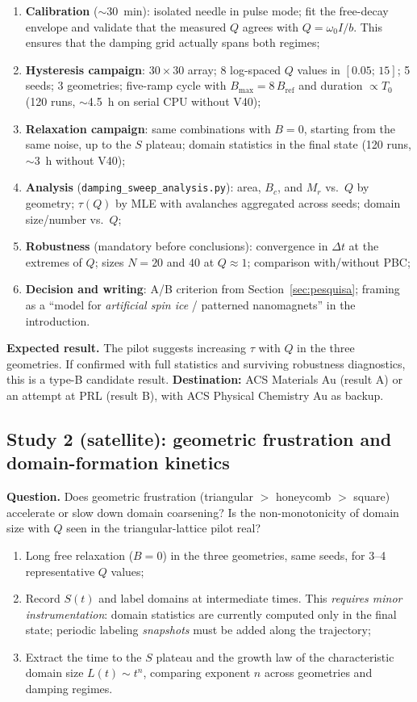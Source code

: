 \documentclass[11pt,a4paper]{article}
\newcommand{\code}[1]{\texttt{#1}}
\begin{document}
\begin{enumerate}
\item \textbf{Calibration} ($\sim$30~min): isolated needle in pulse mode; fit the free-decay envelope and validate that the measured $Q$ agrees with $Q = \omega_0 I / b$. This ensures that the damping grid actually spans both regimes;
\item \textbf{Hysteresis campaign}: $30\times30$ array; 8 log-spaced $Q$ values in $[0.05;\,15]$; 5 seeds; 3 geometries; five-ramp cycle with $B_{\max} = 8\,B_{\mathrm{ref}}$ and duration $\propto T_0$ (120 runs, $\sim$4.5~h on serial CPU without V40);
\item \textbf{Relaxation campaign}: same combinations with $B = 0$, starting from the same noise, up to the $S$ plateau; domain statistics in the final state (120 runs, $\sim$3~h without V40);
\item \textbf{Analysis} (\code{damping\_sweep\_analysis.py}): area, $B_c$, and $M_r$ vs.\ $Q$ by geometry; $\tau(Q)$ by MLE with avalanches aggregated across seeds; domain size/number vs.\ $Q$;
\item \textbf{Robustness} (mandatory before conclusions): convergence in $\Delta t$ at the extremes of $Q$; sizes $N = 20$ and $40$ at $Q \approx 1$; comparison with/without PBC;
\item \textbf{Decision and writing}: A/B criterion from Section~\ref{sec:pesquisa}; framing as a ``model for \emph{artificial spin ice} / patterned nanomagnets'' in the introduction.
\end{enumerate}

\textbf{Expected result.} The pilot suggests increasing $\tau$ with $Q$ in the three geometries. If confirmed with full statistics and surviving robustness diagnostics, this is a type-B candidate result. \textbf{Destination:} ACS Materials Au (result A) or an attempt at PRL (result B), with ACS Physical Chemistry Au as backup.

\subsection{Study 2 (satellite): geometric frustration and domain-formation kinetics}

\textbf{Question.} Does geometric frustration (triangular $>$ honeycomb $>$ square) accelerate or slow down domain coarsening? Is the non-monotonicity of domain size with $Q$ seen in the triangular-lattice pilot real?

\begin{enumerate}
\item Long free relaxation ($B = 0$) in the three geometries, same seeds, for 3--4 representative $Q$ values;
\item Record $S(t)$ and label domains at intermediate times. This \emph{requires minor instrumentation}: domain statistics are currently computed only in the final state; periodic labeling \emph{snapshots} must be added along the trajectory;
\item Extract the time to the $S$ plateau and the growth law of the characteristic domain size $L(t) \sim t^{n}$, comparing exponent $n$ across geometries and damping regimes.
\end{enumerate}
\end{document}
